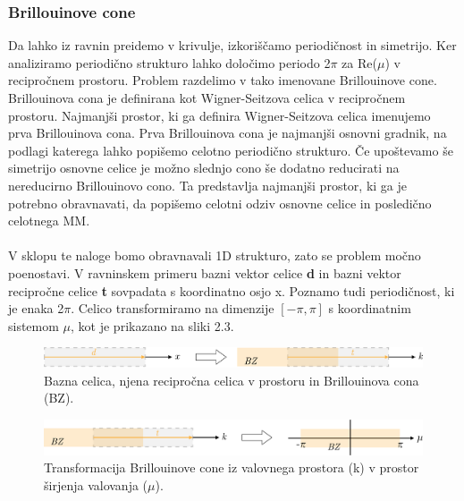 \documentclass[12pt]{report}
\begin{document}
\subsubsection{Brillouinove cone}
Da lahko iz ravnin preidemo v krivulje, izkoriščamo periodičnost in simetrijo. Ker analiziramo periodično strukturo lahko določimo periodo 2$\pi$ za Re($\mu$) v recipročnem prostoru.
Problem razdelimo v tako imenovane Brillouinove cone. \cite{vanbelle}
\\Brillouinova cona je definirana kot Wigner-Seitzova celica v recipročnem prostoru. Najmanjši prostor, ki ga definira Wigner-Seitzova celica imenujemo prva Brillouinova cona.\cite{abhipod} Prva Brillouinova cona
je najmanjši osnovni gradnik, na podlagi katerega lahko popišemo celotno periodično strukturo. Če upoštevamo še simetrijo osnovne celice je možno slednjo cono še dodatno reducirati na nereducirno Brillouinovo cono. Ta predstavlja najmanjši prostor,
ki ga je potrebno obravnavati, da popišemo celotni odziv osnovne celice in posledično celotnega \ac{MM}. \cite{kosir}
\\
\\
V sklopu te naloge bomo obravnavali 1D strukturo, zato se problem močno poenostavi. V ravninskem primeru bazni vektor celice \textbf{d} in bazni vektor recipročne celice \textbf{t} sovpadata s koordinatno osjo x. Poznamo tudi periodičnost, ki je enaka 2$\pi$. 
Celico transformiramo na dimenzije $[-\pi, \pi]$ s koordinatnim sistemom $\mu$, kot je prikazano na sliki 2.3.

\begin{figure}[H]
  \centering
  \includegraphics[scale=0.8]{Images/osnovna_celica.png}
  \caption{Bazna celica, njena recipročna celica v prostoru in Brillouinova cona (BZ).}
\end{figure}
\begin{figure}[H]
  \centering
  \includegraphics[scale=0.8]{Images/transformacija.png}
  \caption{Transformacija Brillouinove cone iz valovnega prostora (k) v prostor širjenja valovanja ($\mu$).}
\end{figure}
\end{document}

